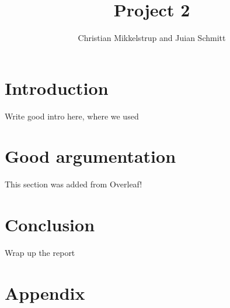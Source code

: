 \documentclass[12pt,a4paper]{article}
\title{Project 2}
\author{Christian Mikkelstrup and Juian Schmitt}
\begin{document}
\maketitle

\section{Introduction}
Write good intro here, where we used \cite{golub2013a}
\section{Good argumentation}
This section was added from Overleaf!
\section{Conclusion}
Wrap up the report


\newpage
\section{Appendix}\label{sec:appendix}
\end{document}
